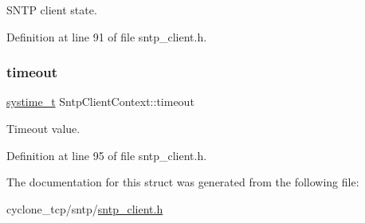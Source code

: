 S\+N\+TP client state. 



Definition at line 91 of file sntp\+\_\+client.\+h.

\mbox{\label{structSntpClientContext_aeaec29fda82d9d620c9078d06a4d7b17}} 
\subsubsection{\texorpdfstring{timeout}{timeout}}
{\footnotesize\ttfamily \hyperlink{compiler__port_8h_ae3e32a98d431a02106616da3071832dd}{systime\+\_\+t} Sntp\+Client\+Context\+::timeout}



Timeout value. 



Definition at line 95 of file sntp\+\_\+client.\+h.



The documentation for this struct was generated from the following file\+:\begin{DoxyCompactItemize}
\item 
cyclone\+\_\+tcp/sntp/\hyperlink{sntp__client_8h}{sntp\+\_\+client.\+h}\end{DoxyCompactItemize}
